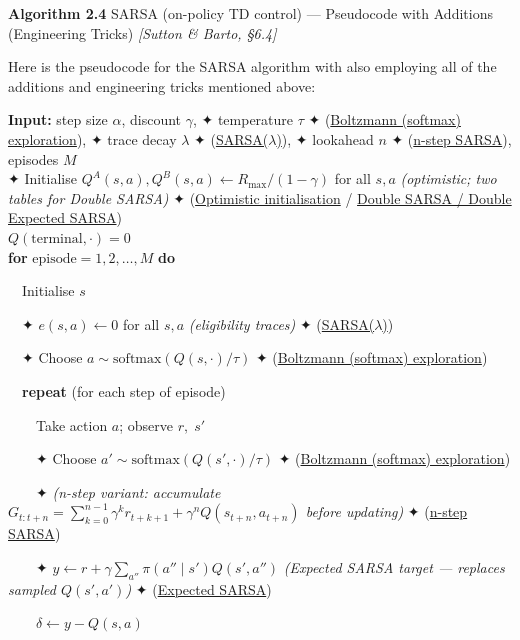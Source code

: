\documentclass[11pt]{article}
\begin{document}
    \begin{pseudobox}

\textbf{Algorithm 2.4} SARSA (on-policy TD control) --- Pseudocode with
Additions (Engineering Tricks) \emph{{[}Sutton \& Barto, §6.4{]}}

\tcbline

Here is the pseudocode for the SARSA algorithm with also employing all
of the additions and engineering tricks mentioned above:

\textbf{Input:} step size \(\alpha\), discount \(\gamma\), ✦ temperature
\(\tau\) ✦ (\hyperref[trick-2-4-3]{Boltzmann (softmax) exploration}), ✦
trace decay \(\lambda\) ✦ (\hyperref[trick-2-4-2]{SARSA(\(\lambda\))}),
✦ lookahead \(n\) ✦ (\hyperref[trick-2-4-4]{n-step SARSA}), episodes
\(M\)\\
✦ Initialise \(Q^A(s,a), Q^B(s,a) \leftarrow R_\text{max}/(1-\gamma)\)
for all \(s, a\) \emph{(optimistic; two tables for Double SARSA)} ✦
(\hyperref[trick-2-4-6]{Optimistic initialisation} /
\hyperref[trick-2-4-5]{Double SARSA / Double Expected SARSA})\\
\(Q(\text{terminal}, \cdot) = 0\)\\
\textbf{for} \(\text{episode} = 1, 2, \ldots, M\) \textbf{do}\\
\strut ~~Initialise \(s\)\\
\strut ~~✦ \(e(s,a) \leftarrow 0\) for all \(s, a\) \emph{(eligibility
traces)} ✦ (\hyperref[trick-2-4-2]{SARSA(\(\lambda\))})\\
\strut ~~✦ Choose \(a \sim \mathrm{softmax}(Q(s,\cdot)/\tau)\) ✦
(\hyperref[trick-2-4-3]{Boltzmann (softmax) exploration})\\
\strut ~~\textbf{repeat} (for each step of episode)\\
\strut ~~~~Take action \(a\); observe \(r,\; s'\)\\
\strut ~~~~✦ Choose \(a' \sim \mathrm{softmax}(Q(s',\cdot)/\tau)\) ✦
(\hyperref[trick-2-4-3]{Boltzmann (softmax) exploration})\\
\strut ~~~~✦ \emph{(n-step variant: accumulate
\(G_{t:t+n} = \sum_{k=0}^{n-1}\gamma^k r_{t+k+1} + \gamma^n Q(s_{t+n},a_{t+n})\)
before updating)} ✦ (\hyperref[trick-2-4-4]{n-step SARSA})\\
\strut ~~~~✦
\(y \leftarrow r + \gamma\sum_{a''}\pi(a''\mid s')Q(s',a'')\)
\emph{(Expected SARSA target --- replaces sampled \(Q(s',a')\))} ✦
(\hyperref[trick-2-4-1]{Expected SARSA})\\
\strut ~~~~\(\delta \leftarrow y - Q(s, a)\)\\

\end{pseudobox}
\end{document}
